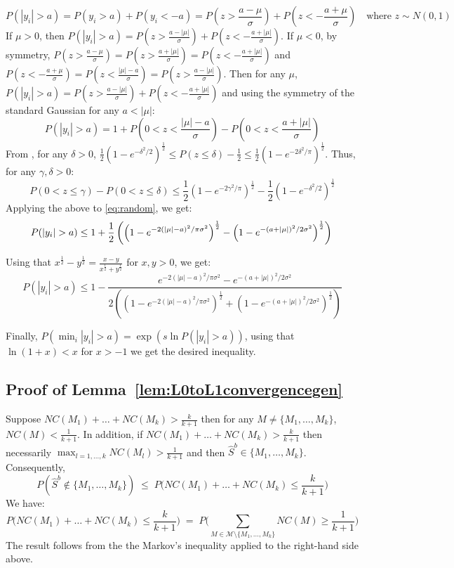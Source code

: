 \documentclass[aos]{imsart}
\theoremstyle{plain}
\begin{document}
\begin{supplement}
$$P(|y_i|>a) = P(y_i>a) + P(y_i<-a) = P(z>\frac{a-\mu}{\sigma}) + P(z<-\frac{a+\mu}{\sigma}) \quad \text{where }z\sim N(0,1)$$
If $\mu>0$, then $P(|y_i|>a) =  P(z>\frac{a-|\mu|}{\sigma}) + P(z<-\frac{a+|\mu|}{\sigma})$. If $\mu<0$, by symmetry, $P(z>\frac{a-\mu}{\sigma})=P(z>\frac{a+|\mu|}{\sigma})=P(z<-\frac{a+|\mu|}{\sigma})$ and $P(z<-\frac{a+\mu}{\sigma})=P(z<\frac{|\mu|-a}{\sigma})=P(z>\frac{a-|\mu|}{\sigma})$. Then for any $\mu$, $P(|y_i|>a)  = P(z>\frac{a-|\mu|}{\sigma}) + P(z<-\frac{a+|\mu|}{\sigma}) $ and using the symmetry of the standard Gaussian for any $a<|\mu|$: 
\begin{equation}\label{eq:random}
    P(|y_i|>a) = 1+P(0<z<\frac{|\mu|-a}{\sigma})-P(0<z<\frac{a+|\mu|}{\sigma})
\end{equation}
From \cite{chu}, for any $\delta>0$, $\frac{1}{2}\left(1-e^{-\delta^2/2}\right)^{\frac{1}{2}}\leq P(z \leq \delta)-\frac{1}{2}\leq \frac{1}{2}\left(1-e^{-2\delta^2/\pi}\right)^{\frac{1}{2}}$. Thus, for any $\gamma,\delta>0$:
$$ P(0<z \leq \gamma)-P(0<z \leq \delta)\leq
\frac{1}{2}\left(1-e^{-2\gamma^2/\pi}\right)^{\frac{1}{2}}-\frac{1}{2}\left(1-e^{-\delta^2/2}\right)^{\frac{1}{2}}$$
Applying the above to \eqref{eq:random}, we get:
$$P(|y_i|>a) \leq 
1+ \frac{1}{2}\left(\left(1-e^{-2(|\mu|-a)^2/\pi\sigma^2}\right)^{\frac{1}{2}}-\left(1-e^{-(a+|\mu|)^2/2\sigma^2}\right)^{\frac{1}{2}}\right)\\$$

Using that $x^{\frac{1}{2}}-y^{\frac{1}{2}}=\frac{x-y}{x^{\frac{1}{2}}+y^{\frac{1}{2}}}$ for $x,y>0$, we get:
$$P(|y_i|>a) \leq 1- \frac{e^{-2(|\mu|-a)^2/\pi\sigma^2}-e^{-(a+|\mu|)^2/2\sigma^2}}{2\left(\left(1-e^{-2(|\mu|-a)^2/\pi\sigma^2}\right)^{\frac{1}{2}}+\left(1-e^{-(a+|\mu|)^2/2\sigma^2}\right)^{\frac{1}{2}}\right)}$$

Finally, $P(\min_{i}|y_i|>a)=\exp\left(s\ln{P(|y_i|>a)}\right)$, using that $\ln\left(1+ x \right)< x$ for $x>-1$ we get the desired inequality.

\subsection{Proof of Lemma~\ref{lem:L0toL1convergencegen}}
Suppose $NC(M_1)+\ldots+NC(M_k)>\frac{k}{k+1}$ then for any $M\neq \{M_1,\ldots,M_k\}$, $NC(M)<\frac{1}{k+1}$. In addition, if $NC(M_1)+\ldots+NC(M_k)>\frac{k}{k+1}$ then necessarily $\max_{l=1,\ldots,k}NC(M_l)> \frac{1}{k+1}$ and then $\hat{S}^{b}\in \{M_1,\ldots,M_k\}$. Consequently, 
$$
P(\hat{S}^b\not\in \{M_1,\ldots,M_k\})\; \leq\; P\Big(NC(M_1)+\ldots+NC(M_k)\leq\frac{k}{k+1}\Big)$$
We have:
$$P\Big(NC(M_1)+\ldots+NC(M_k)\leq\frac{k}{k+1}\Big)\;=\;P\Big(\sum_{M \in \mathcal{M}\setminus \{M_1,\ldots,M_k\}} NC(M)\geq \frac{1}{k+1}\Big)$$
The result follows from the the Markov's inequality applied to the right-hand side above.


\end{supplement}
\end{document}
